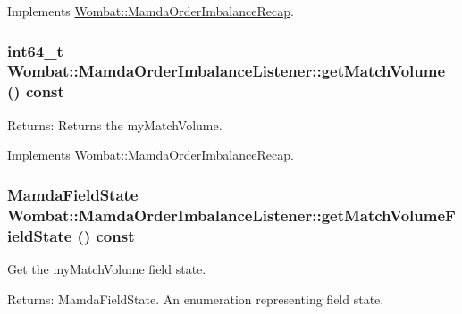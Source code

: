 Implements \hyperlink{classWombat_1_1MamdaOrderImbalanceRecap_cc07b533268359fb2a968d83ffe618be}{Wombat::Mamda\-Order\-Imbalance\-Recap}.\hypertarget{classWombat_1_1MamdaOrderImbalanceListener_db5df0bb4c22c84ef0572046aaf98220}{
\subsubsection[getMatchVolume]{\setlength{\rightskip}{0pt plus 5cm}int64\_\-t Wombat::Mamda\-Order\-Imbalance\-Listener::get\-Match\-Volume () const}}
\label{classWombat_1_1MamdaOrderImbalanceListener_db5df0bb4c22c84ef0572046aaf98220}


\begin{Desc}
\item[Returns:]Returns the my\-Match\-Volume. \end{Desc}


Implements \hyperlink{classWombat_1_1MamdaOrderImbalanceRecap_2d983f66653cb0ca55dc88093794d850}{Wombat::Mamda\-Order\-Imbalance\-Recap}.\hypertarget{classWombat_1_1MamdaOrderImbalanceListener_bbba7d810e3b01e9b2041d3a0e0e517d}{
\subsubsection[getMatchVolumeFieldState]{\setlength{\rightskip}{0pt plus 5cm}\hyperlink{namespaceWombat_93aac974f2ab713554fd12a1fa3b7d2a}{Mamda\-Field\-State} Wombat::Mamda\-Order\-Imbalance\-Listener::get\-Match\-Volume\-Field\-State () const}}
\label{classWombat_1_1MamdaOrderImbalanceListener_bbba7d810e3b01e9b2041d3a0e0e517d}


Get the my\-Match\-Volume field state. 

\begin{Desc}
\item[Returns:]Mamda\-Field\-State. An enumeration representing field state. \end{Desc}


